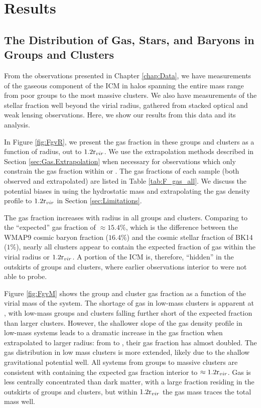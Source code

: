 \chapter{Results}
\label{chap:Results}

\section{The Distribution of Gas, Stars, and Baryons in Groups and Clusters}
\label{sec:Spatial}

From the observations presented in Chapter \ref{chap:Data}, we have
measurements of the gaseous component of the ICM in halos spanning the
entire mass range from poor groups to the most massive clusters. We
also have measurements of the stellar fraction well beyond the virial
radius, gathered from stacked optical and weak lensing
observations. Here, we show our results from this data and its
analysis.

In Figure \ref{fig:FgvR}, we present the gas fraction in these groups
and clusters as a function of radius, out to $1.2\textrm{r\ensuremath{_{vir}}}{}$. We use
the extrapolation methods described in Section
\ref{sec:Gas.Extrapolation} when necessary for observations which only
constrain the gas fraction within \rfive{} or \rtwo{}. The gas
fractions of each sample (both observed and extrapolated) are listed
in Table \ref{tab:F_gas_all}. We discuss the potential biases in using
the hydrostatic mass and extrapolating the gas density profile to
$1.2\textrm{r\ensuremath{_{vir}}}$ in Section \ref{sec:Limitations}.


\afterpage{\clearpage}

The gas fraction increases with radius in all groups and
clusters. Comparing to the ``expected'' gas fraction of $\approx
15.4\%$, which is the difference between the WMAP9 cosmic baryon
fraction ($16.4\%$) and the cosmic stellar fraction of BK14 ($1\%$),
nearly all clusters appear to contain the expected fraction of gas
within the virial radius or $1.2\textrm{r\ensuremath{_{vir}}}$. A portion of the ICM is,
therefore, ``hidden'' in the outskirts of groups and clusters, where
earlier observations interior to \rfive{} were not able to probe.

 

Figure \ref{fig:FgvM} shows the group and cluster gas fraction as a
function of the virial mass of the system. The shortage of gas in
low-mass clusters is apparent at \rfive{}, with low-mass groups and
clusters falling further short of the expected fraction than larger
clusters. However, the shallower slope of the gas density profile in
low-mass systems leads to a dramatic increase in the gas fraction when
extrapolated to larger radius: from \rfive{} to \rvir{}, their gas
fraction has almost doubled. The gas distribution in low mass clusters
is more extended, likely due to the shallow gravitational potential
well. All systems from groups to massive clusters are consistent with
containing the expected gas fraction interior to
$\approx1.2\textrm{r\ensuremath{_{vir}}}$. Gas is less centrally concentrated than dark
matter, with a large fraction residing in the outskirts of groups and
clusters, but within $1.2\textrm{r\ensuremath{_{vir}}}$ the gas mass traces the total mass
well.

